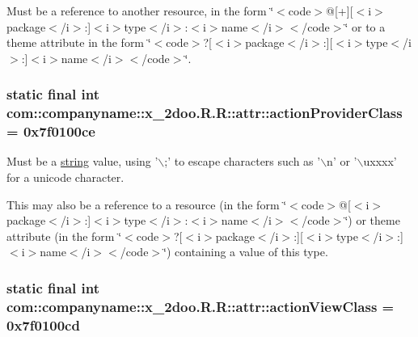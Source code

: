 Must be a reference to another resource, in the form \char`\"{}$<$code$>$@\mbox{[}+\mbox{]}\mbox{[}$<$i$>$package$<$/i$>$:\mbox{]}$<$i$>$type$<$/i$>$:$<$i$>$name$<$/i$>$$<$/code$>$\char`\"{} or to a theme attribute in the form \char`\"{}$<$code$>$?\mbox{[}$<$i$>$package$<$/i$>$:\mbox{]}\mbox{[}$<$i$>$type$<$/i$>$:\mbox{]}$<$i$>$name$<$/i$>$$<$/code$>$\char`\"{}. \hypertarget{classcom_1_1companyname_1_1x__2doo_1_1_r_1_1attr_6f2995e817a9115a888ff40dda700af2}{
\subsubsection[{actionProviderClass}]{\setlength{\rightskip}{0pt plus 5cm}static final int com::companyname::x\_\-2doo.R.R::attr::actionProviderClass = 0x7f0100ce}}
\label{classcom_1_1companyname_1_1x__2doo_1_1_r_1_1attr_6f2995e817a9115a888ff40dda700af2}


Must be a \hyperlink{classcom_1_1companyname_1_1x__2doo_1_1_r_1_1string}{string} value, using '$\backslash$;' to escape characters such as '$\backslash$n' or '$\backslash$uxxxx' for a unicode character. 

This may also be a reference to a resource (in the form \char`\"{}$<$code$>$@\mbox{[}$<$i$>$package$<$/i$>$:\mbox{]}$<$i$>$type$<$/i$>$:$<$i$>$name$<$/i$>$$<$/code$>$\char`\"{}) or theme attribute (in the form \char`\"{}$<$code$>$?\mbox{[}$<$i$>$package$<$/i$>$:\mbox{]}\mbox{[}$<$i$>$type$<$/i$>$:\mbox{]}$<$i$>$name$<$/i$>$$<$/code$>$\char`\"{}) containing a value of this type. \hypertarget{classcom_1_1companyname_1_1x__2doo_1_1_r_1_1attr_b577c791883e3126233013cc2268f77d}{
\subsubsection[{actionViewClass}]{\setlength{\rightskip}{0pt plus 5cm}static final int com::companyname::x\_\-2doo.R.R::attr::actionViewClass = 0x7f0100cd}}
\label{classcom_1_1companyname_1_1x__2doo_1_1_r_1_1attr_b577c791883e3126233013cc2268f77d}


